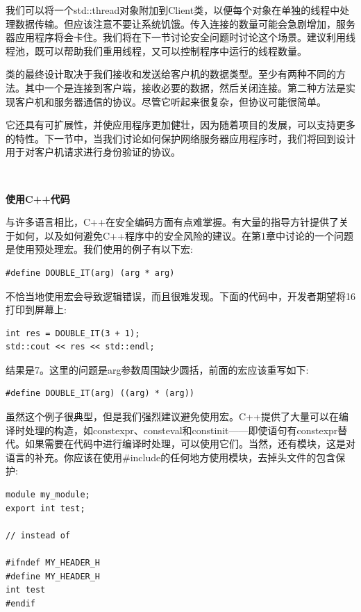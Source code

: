 我们可以将一个std::thread对象附加到Client类，以便每个对象在单独的线程中处理数据传输。但应该注意不要让系统饥饿。传入连接的数量可能会急剧增加，服务器应用程序将会卡住。我们将在下一节讨论安全问题时讨论这个场景。建议利用线程池，既可以帮助我们重用线程，又可以控制程序中运行的线程数量。 \par
类的最终设计取决于我们接收和发送给客户机的数据类型。至少有两种不同的方法。其中一个是连接到客户端，接收必要的数据，然后关闭连接。第二种方法是实现客户机和服务器通信的协议。尽管它听起来很复杂，但协议可能很简单。 \par
它还具有可扩展性，并使应用程序更加健壮，因为随着项目的发展，可以支持更多的特性。下一节中，当我们讨论如何保护网络服务器应用程序时，我们将回到设计用于对客户机请求进行身份验证的协议。 \par

\noindent\textbf{}\ \par
\textbf{使用C++代码} \ \par
与许多语言相比，C++在安全编码方面有点难掌握。有大量的指导方针提供了关于如何，以及如何避免C++程序中的安全风险的建议。在第1章中讨论的一个问题是使用预处理宏。我们使用的例子有以下宏: \par

\begin{lstlisting}[caption={}]
#define DOUBLE_IT(arg) (arg * arg)
\end{lstlisting}

不恰当地使用宏会导致逻辑错误，而且很难发现。下面的代码中，开发者期望将16打印到屏幕上: \par

\begin{lstlisting}[caption={}]
int res = DOUBLE_IT(3 + 1);
std::cout << res << std::endl;
\end{lstlisting}

结果是7。这里的问题是arg参数周围缺少圆括，前面的宏应该重写如下: \par

\begin{lstlisting}[caption={}]
#define DOUBLE_IT(arg) ((arg) * (arg))
\end{lstlisting}

虽然这个例子很典型，但是我们强烈建议避免使用宏。C++提供了大量可以在编译时处理的构造，如constexpr、consteval和constinit——即使语句有constexpr替代。如果需要在代码中进行编译时处理，可以使用它们。当然，还有模块，这是对语言的补充。你应该在使用\#include的任何地方使用模块，去掉头文件的包含保护: \par

\begin{lstlisting}[caption={}]
module my_module;
export int test;

// instead of

#ifndef MY_HEADER_H
#define MY_HEADER_H
int test
#endif
\end{lstlisting}

